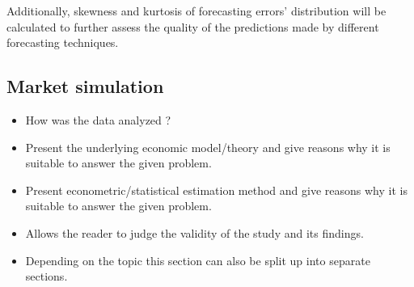 Additionally, skewness and kurtosis of forecasting errors’ distribution will be calculated to further assess the quality of the predictions made by different forecasting techniques.




\subsection{Market simulation}\label{Sec:Method;Subsec:Market}




\begin{itemize}

    \item How was the data analyzed ?

    \item Present the underlying economic model/theory and
        give reasons why it is suitable to answer the given problem.

    \item Present econometric/statistical estimation method and
        give reasons why it is suitable to answer the given problem.

    \item Allows the reader to judge the validity of the study and its findings.

    \item Depending on the topic this section can also be split up into separate sections.

\end{itemize}
